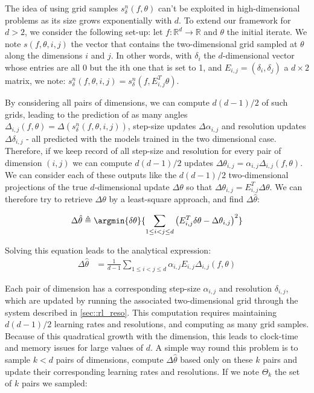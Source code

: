 	The idea of using grid samples $s_\delta^n(f,\theta)$ can't be exploited in high-dimensional problems as its size grows exponentially with $d$. To extend our framework for $d>2$, we consider the following set-up: let $f: \mathbb{R}^d \to \mathbb{R}$ and $\theta$ the initial iterate. We note $s(f,\theta,i,j)$ the vector that contains the two-dimensional grid sampled at $\theta$ along the dimensions $i$ and $j$. In other words, with $\delta_i$ the $d$-dimensional vector whose entries are all 0 but the ith one that is set to 1, and $E_{i,j} = (\delta_i,\delta_j)$ a $d\times2$ matrix, we note: $s_\delta^n(f,\theta,i,j) = s_\delta^n(f,E_{i,j}^T\theta)$.
		
		By considering all pairs of dimensions, we can compute $d(d-1)/2$ of such grids, leading to the prediction of as many angles $\Delta_{i,j}(f,\theta) = \Delta(s_\delta^n(f,\theta,i,j))$, step-size updates $\Delta \alpha_{i,j}$ and resolution updates $\Delta \delta_{i,j}$ - all predicted with the models trained in the two dimensional case. Therefore, if we keep record of all step-size and resolution for every pair of dimension $(i,j)$ we can compute $d(d-1)/2$ updates $\Delta \theta_{i,j} = \alpha_{i,j} \Delta_{i,j}(f,\theta)$. We can consider each of these outputs like the $d(d-1)/2$ two-dimensional projections of the true $d$-dimensional update $\Delta \theta$ so that $\Delta \theta_{i,j}= E_{i,j}^T \Delta \theta$. We can therefore try to retrieve $\Delta\theta$ by a least-square approach, and find $\Delta \hat{\theta}$:
		
		\begin{equation}
			\Delta \hat{\theta}\triangleq \argmin{\delta \theta}{ \sum_{1\leq i < j \leq d} \left(E_{i,j}^T \delta\theta - \Delta\theta_{i,j}\right)^2}
		\end{equation}
		
		Solving this equation leads to the analytical expression:
		\begin{equation}
			\begin{aligned}
				\Delta \hat{\theta}
							&= \frac{1}{d-1} \sum_{1\leq i < j \leq d} \alpha_{i,j} E_{i,j}\Delta_{i,j}(f,\theta)
			\end{aligned}
		\end{equation}
		
		Each pair of dimension has a corresponding step-size $\alpha_{i,j}$  and resolution $\delta_{i,j}$, which are updated by running the associated two-dimensional grid through the system described in \ref{sec::rl_reso}. This computation requires maintaining $d(d-1)/2$ learning rates and resolutions, and computing as many grid samples. Because of this quadratical growth with the dimension, this leads to clock-time and memory issues for large values of $d$. A simple way round this problem is to sample $k<d$ pairs of dimensions, compute $\Delta\hat{\theta}$ based only on these $k$ pairs and update their corresponding learning rates and resolutions. If we note $\Theta_k$ the set of $k$ pairs we sampled:
		

